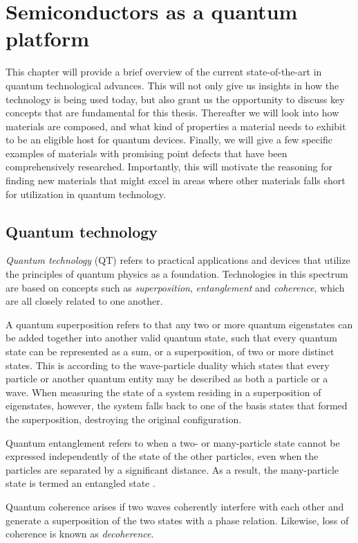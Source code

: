 \chapter{Semiconductors as a quantum platform}

This chapter will provide a brief overview of the current state-of-the-art in quantum technological advances. This will not only give us insights in how the technology is being used today, but also grant us the opportunity to discuss key concepts that are fundamental for this thesis. Thereafter we will look into how materials are composed, and what kind of properties a material needs to exhibit to be an eligible host for quantum devices. Finally, we will give a few specific examples of materials with promising point defects that have been comprehensively researched. Importantly, this will motivate the reasoning for finding new materials that might excel in areas where other materials falls short for utilization in quantum technology.

\section{Quantum technology}
\textit{Quantum technology} (QT) refers to practical applications and devices that utilize the principles of quantum physics as a foundation. Technologies in this spectrum are based on concepts such as \textit{superposition}, \textit{entanglement} and \textit{coherence}, which are all closely related to one another.

A quantum superposition refers to that any two or more quantum eigenstates can be added together into another valid quantum state, such that every quantum state can be represented as a sum, or a superposition, of two or more distinct states. This is according to the wave-particle duality which states that every particle or another quantum entity may be described as both a particle or a wave. When measuring the state of a system residing in a superposition of eigenstates, however, the system falls back to one of the basis states that formed the superposition, destroying the original configuration.

Quantum entanglement refers to when a two- or many-particle state cannot be expressed independently of the state of the other particles, even when the particles are separated by a significant distance. As a result, the many-particle state is termed an entangled state \cite{Griffiths2017}.

Quantum coherence arises if two waves coherently interfere with each other and generate a superposition of the two states with a phase relation. Likewise, loss of coherence is known as \textit{decoherence}.

